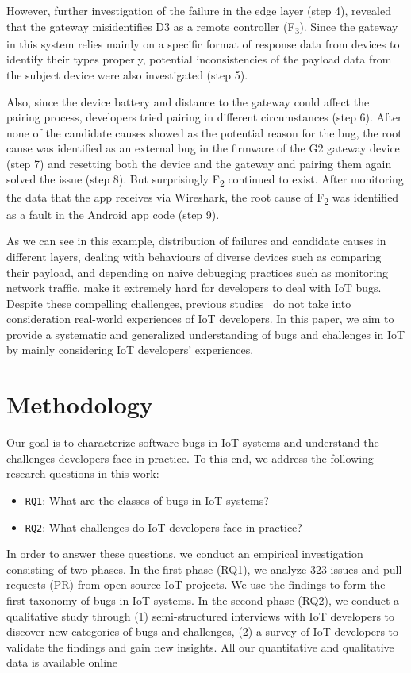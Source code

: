 However, further investigation of the failure in the edge layer (step 4), revealed that the gateway misidentifies D3 as a remote controller (F\textsubscript{3}). Since the gateway in this system relies mainly on a specific format of response data from devices to identify their types properly, potential inconsistencies of the payload data from the subject device were also investigated (step 5). 


Also, since the device battery and distance to the gateway could affect the pairing process, developers tried pairing in different circumstances (step 6). After none of the candidate causes showed as the potential reason for the bug, the root cause was identified as an external bug in the firmware of the G2 gateway device (step 7) and resetting both the device and the gateway and pairing them again solved the issue (step 8). But surprisingly F\textsubscript{2} continued to exist. After monitoring the data that the app receives via Wireshark, the root cause of F\textsubscript{2} was identified as a fault in the Android app code (step 9).


As we can see in this example, distribution of failures and candidate causes in different layers, dealing with behaviours of diverse devices such as comparing their payload, and depending on naive debugging practices such as monitoring network traffic, make it extremely hard for developers to deal with IoT bugs. Despite these compelling challenges, previous studies~\cite{hnat2011hitchhiker,corno2019challenges,stojkoska2017review,chen2017application,IoTOSBugs} do not take into consideration real-world experiences of IoT developers. In this paper, we aim to provide a systematic and generalized understanding of bugs and challenges in IoT by mainly considering IoT developers' experiences.


\section{Methodology}
Our goal is to characterize software bugs in IoT systems and understand the challenges developers face in practice. To this end, we address the following research questions in this work:
\begin{itemize}
\item {\verb|RQ1|}: What are the classes of bugs in IoT systems?
\item {\verb|RQ2|}: What challenges do IoT developers face in practice?
\end{itemize}
In order to answer these questions, we conduct an empirical investigation consisting of two phases. In the first phase (RQ1), we analyze 323 issues and pull requests (PR) from open-source IoT projects. We use the findings to form the first taxonomy of bugs in IoT systems. In the second phase (RQ2), we conduct a qualitative study through (1) semi-structured interviews with IoT developers to discover new categories of bugs and challenges, (2) a survey of IoT developers to validate the findings and gain new insights. All our quantitative and qualitative data is available online~\cite{repPack} 

